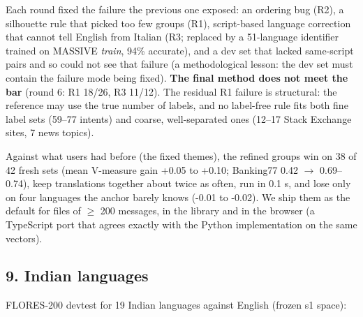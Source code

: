 \documentclass[
  10pt,
]{article}
\begin{document}
Each round fixed the failure the previous one exposed: an ordering bug
(R2), a silhouette rule that picked too few groups (R1), script-based
language correction that cannot tell English from Italian (R3; replaced
by a 51-language identifier trained on MASSIVE \emph{train}, 94\%
accurate), and a dev set that lacked same-script pairs and so could not
see that failure (a methodological lesson: the dev set must contain the
failure mode being fixed). \textbf{The final method does not meet the
bar} (round 6: R1 18/26, R3 11/12). The residual R1 failure is
structural: the reference may use the true number of labels, and no
label-free rule fits both fine label sets (59--77 intents) and coarse,
well-separated ones (12--17 Stack Exchange sites, 7 news topics).

Against what users had before (the fixed themes), the refined groups win
on 38 of 42 fresh sets (mean V-measure gain +0.05 to +0.10; Banking77
0.42 $\rightarrow$ 0.69--0.74), keep translations together about twice as often, run
in 0.1 s, and lose only on four languages the anchor barely knows (-0.01
to -0.02). We ship them as the default for files of $\geq$ 200 messages, in
the library and in the browser (a TypeScript port that agrees exactly
with the Python implementation on the same vectors).

\hypertarget{indian-languages}{%
\subsection{9. Indian languages}\label{indian-languages}}

FLORES-200 devtest for 19 Indian languages against English (frozen s1
space):
\end{document}
